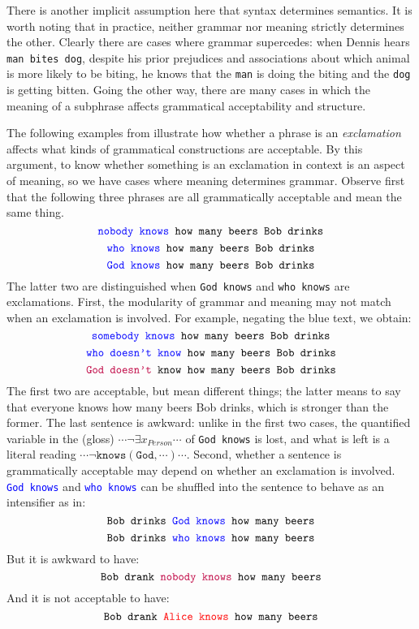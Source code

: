 There is another implicit assumption here that syntax determines semantics. It is worth noting that in practice, neither grammar nor meaning strictly determines the other. Clearly there are cases where grammar supercedes: when Dennis hears \texttt{man bites dog}, despite his prior prejudices and associations about which animal is more likely to be biting, he knows that the \texttt{man} is doing the biting and the \texttt{dog} is getting bitten. Going the other way, there are many cases in which the meaning of a subphrase affects grammatical acceptability and structure.

\begin{example}
The following examples from \bR [Lakofflecture] \e illustrate how whether a phrase is an \emph{exclamation} affects what kinds of grammatical constructions are acceptable. By this argument, to know whether something is an exclamation in context is an aspect of meaning, so we have cases where meaning determines grammar. Observe first that the following three phrases are all grammatically acceptable and mean the same thing.
\[\texttt{\textcolor{blue}{nobody knows} how many beers Bob drinks}\]
\[\texttt{\textcolor{blue}{who knows} how many beers Bob drinks}\]
\[\texttt{\textcolor{blue}{God knows} how many beers Bob drinks}\]
The latter two are distinguished when \texttt{God knows} and \texttt{who knows} are exclamations. First, the modularity of grammar and meaning may not match when an exclamation is involved. For example, negating the blue text, we obtain:
\[\texttt{\textcolor{blue}{somebody knows} how many beers Bob drinks}\]
\[\texttt{\textcolor{blue}{who doesn't know} how many beers Bob drinks}\]
\[\texttt{\textcolor{purple}{God doesn't} know how many beers Bob drinks}\]
The first two are acceptable, but mean different things; the latter means to say that everyone knows how many beers Bob drinks, which is stronger than the former. The last sentence is awkward: unlike in the first two cases, the quantified variable in the (gloss) $\cdots \neg \exists x_{Person} \cdots$ of \texttt{God knows} is lost, and what is left is a literal reading $\cdots \neg \texttt{knows}(\texttt{God},\cdots) \cdots$.
Second, whether a sentence is grammatically acceptable may depend on whether an exclamation is involved. \texttt{\textcolor{blue}{God knows}} and \texttt{\textcolor{blue}{who knows}} can be shuffled into the sentence to behave as an intensifier as in:
\[\texttt{Bob drinks \textcolor{blue}{God knows} how many beers}\]
\[\texttt{Bob drinks \textcolor{blue}{who knows} how many beers}\]
But it is awkward to have:
\[\texttt{Bob drank \textcolor{purple}{nobody knows} how many beers}\]
And it is not acceptable to have:
\[\texttt{Bob drank \textcolor{red}{Alice knows} how many beers}\]
\end{example}

